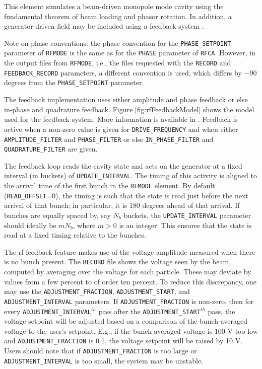 This element simulates a beam-driven monopole mode cavity using the fundamental theorem of beam loading and phasor rotation.
In addition, a generator-driven field may be included using a feedback system \cite{Berenc-IPAC15-MOPMA006}.

Note on phase conventions: the phase convention for the \verb|PHASE_SETPOINT|  parameter of \verb|RFMODE| is the
same as for the \verb|PHASE| parameter of \verb|RFCA|. However, in the output files from \verb|RFMODE|, i.e., the
files requested with the \verb|RECORD| and \verb|FEEDBACK_RECORD| parameters, a different convention is used, which 
differs by $-90$ degrees from the \verb|PHASE_SETPOINT|  parameter. 

The feedback implementation uses either amplitude and phase feedback or else in-phase and quadrature feedback.
Figure \ref{fig:rfFeedbackModel} shows the model used for the feedback system.
More information is available in \cite{Berenc-IPAC15-MOPMA006}.
Feedback is active when a non-zero value is given for \verb|DRIVE_FREQUENCY| and when either
\verb|AMPLITUDE_FILTER| and \verb|PHASE_FILTER| or else
\verb|IN_PHASE_FILTER| and \verb|QUADRATURE_FILTER| are given.

The feedback loop reads the cavity state and acts on the generator at a fixed interval (in buckets) of
\verb|UPDATE_INTERVAL|. 
The timing of this activity is aligned to the arrival time of the first bunch in the \verb|RFMODE| element.
By default (\verb|READ_OFFSET|=0), the timing is such that the state is read just before the next arrival of
that bunch; in particular, it is 180 degrees ahead of that arrival.
If bunches are equally spaced by, say $N_b$ buckets, the \verb|UPDATE_INTERVAL| parameter should ideally be
$m N_b$, where $m>0$ is an integer.
This ensures that the state is read at a fixed timing relative to the bunches.

The rf feedback feature makes use of the voltage amplitude measured when there is no bunch present.
The \verb|RECORD| file shows the voltage seen by the beam, computed by averaging over the voltage for
each particle.
These may deviate by values from a few percent to of order ten percent.
To reduce this discrepancy, one may use the \verb|ADJUSTMENT_FRACTION|, \verb|ADJUSTMENT_START|, and \verb|ADJUSTMENT_INTERVAL|
parameters.
If \verb|ADJUSTMENT_FRACTION| is non-zero, then for every \verb|ADJUSTMENT_INTERVAL|$^{th}$ pass after the 
\verb|ADJUSTMENT_START|$^{th}$ pass, the voltage setpoint will be adjusted based on a comparison of the bunch-averaged
voltage to the user's setpoint.
E.g., if the bunch-averaged voltage is 100 V too low and \verb|ADJUSTMENT_FRACTION| is 0.1, the voltage setpoint will
be raised by 10 V.
Users should note that if \verb|ADJUSTMENT_FRACTION| is too large or \verb|ADJUSTMENT_INTERVAL| is too small, the system
may be unstable.

